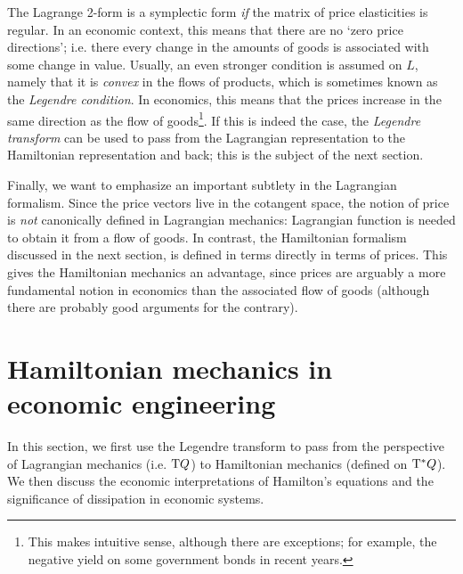 The Lagrange 2-form is a symplectic form \emph{if} the matrix of price elasticities is regular. In an economic context, this means that there are no `zero price directions'; i.e. there every change in the amounts of goods is associated with some change in value. Usually, an even stronger condition is assumed on \(L\), namely that it is \emph{convex} in the flows of products, which is sometimes known as the \emph{Legendre condition}. In economics, this means that the prices increase in the same direction as the flow of goods\footnote{This makes intuitive sense, although there are exceptions; for example, the negative yield on some government bonds in recent years.}. If this is indeed the case, the \emph{Legendre transform} can be used to pass from the Lagrangian representation to the Hamiltonian representation and back; this is the subject of the next section. 

Finally, we want to emphasize an important subtlety in the Lagrangian formalism. Since the price vectors live in the cotangent space, the notion of price is \emph{not} canonically defined in Lagrangian mechanics:  Lagrangian function is needed to obtain it from a flow of goods. In contrast, the Hamiltonian formalism discussed in the next section, is defined in terms directly in terms of prices. This gives the Hamiltonian mechanics an advantage, since prices are arguably a more fundamental notion in economics than the associated flow of goods (although there are probably good arguments for the contrary).

\section{Hamiltonian mechanics in economic engineering}
In this section, we first use the Legendre transform to pass from the perspective of Lagrangian mechanics (i.e. $\mathrm{T}Q$) to Hamiltonian mechanics (defined on $\mathrm{T}^*Q$). We then discuss the economic interpretations of Hamilton's equations and the significance of dissipation in economic systems.

\label{sec:hamiltonian_ee}
